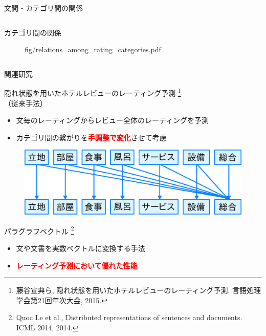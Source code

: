\documentclass[aspectratio=43,unicode,10pt]{beamer}
\newcommand{\fire}[1]{\textcolor{red}{\textbf{#1}}}
\begin{document}
\begin{frame}{文間・カテゴリ間の関係}{}
\begin{columns}[t]
\begin{column}{0.4\textwidth}
\begin{block}{カテゴリ間の関係}
\begin{figure}
                          {fig/relations_among_rating_categories.pdf}
        \end{figure}
      \end{block}
    \end{column}
  \end{columns}
\end{frame}

\begin{frame}{関連研究}{}
  \begin{block}{隠れ状態を用いたホテルレビューのレーティング予測
                \footnote[frame]{
    藤谷宣典ら,
    隠れ状態を用いたホテルレビューのレーティング予測.
    言語処理学会第21回年次大会, 2015.
  }\\（従来手法）}
    \begin{itemize}
      \item 文毎のレーティングからレビュー全体のレーティングを予測
      \item カテゴリ間の繋がりを\fire{手調整で変化}させて考慮
    \end{itemize}
    \begin{figure}
      \vspace{-1em} %
      \includegraphics[width=0.5\linewidth]
                      {fig/fujitani_miml_relations_among_rating_categories.pdf}
      \vspace{-1em} %
    \end{figure}
  \end{block}
  \begin{block}{パラグラフベクトル
                \footnote[frame]{
    Quoc Le et al.,
    Distributed representations of sentences and documents.
    ICML 2014, 2014.
  }}
    \begin{itemize}
      \item 文や文書を実数ベクトルに変換する手法
      \item \fire{レーティング予測において優れた性能}
    \end{itemize}
  \end{block}
\end{frame}
\end{document}
